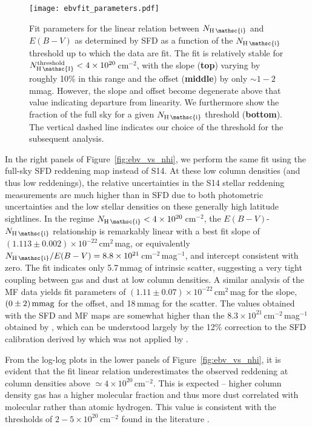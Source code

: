 \documentclass[iop,apj]{emulateapj}
\makeatletter
\def\testbx{bx}%
\DeclareRobustCommand{\ion}[2]{%
\relax\ifmmode
\ifx\testbx\f@series
{\mathbf{#1\,\mathsc{#2}}}\else
{\mathrm{#1\,\mathsc{#2}}}\fi
\else\textup{#1\,{\mdseries\textsc{#2}}}%
\fi}
\makeatother
\begin{document}
\begin{figure}[tp]
	\texttt{[image: ebvfit\_parameters.pdf]}
	\caption{Fit parameters for the linear relation between $N_\ion{H}{i}$ and $E(B-V)$ as determined by SFD as a function of the $N_{\ion{H}{i}}$ threshold up to which the data are fit. The fit is relatively stable for  $N^{\rm threshold}_\ion{H}{I} < 4\times10^{20}$\,cm$^{-2}$, with the slope (\textbf{top}) varying by roughly 10\% in this range and the offset (\textbf{middle}) by only $\sim1-2$\,mmag. However, the slope and offset become degenerate above that value indicating departure from linearity. We furthermore show the fraction of the full sky for a given $N_{\ion{H}{i}}$ threshold (\textbf{bottom}). The vertical dashed line indicates our choice of the threshold for the subsequent analysis.}
	\label{fig:ebv_params}
\end{figure}

In the right panels of Figure~\ref{fig:ebv_vs_nhi}, we perform the same fit using the full-sky SFD reddening map instead of S14. At these low column densities (and thus low reddenings), the relative uncertainties in the S14 stellar reddening measurements are much higher than in SFD due to both photometric uncertainties and the low stellar densities on these generally high latitude sightlines. In the regime $N_\ion{H}{i} < 4\times10^{20}$\,cm$^{-2}$, the $E(B-V)$-$N_\ion{H}{i}$ relationship is remarkably linear with a best fit slope of $\left(1.113\pm0.002\right)\times10^{-22}$\,cm$^2$\,mag, or equivalently $N_\ion{H}{i}/E(B-V) = 8.8\times10^{21}$\,cm$^{-2}$\,mag$^{-1}$, and intercept consistent with zero. The fit indicates only 5.7\,mmag of intrinsic scatter, suggesting a very tight coupling between gas and dust at low column densities. A similar analysis of the MF data yields fit parameters of $\left(1.11\pm0.07\right)\times10^{-22}$\,cm$^2$\,mag for the slope, $(0\pm 2)\rm \, mmag$ for the offset, and 18\,mmag for the scatter. The values obtained with the SFD and MF maps are somewhat higher than the $8.3\times10^{21}$\,cm$^{-2}$\,mag$^{-1}$ obtained by \citet{Liszt_2014a}, which can be understood largely by the 12\% correction to the SFD calibration derived by \citet{Schlafly+Finkbeiner_2011} which was not applied by \citet{Liszt_2014a}.

From the log-log plots in the lower panels of Figure~\ref{fig:ebv_vs_nhi}, it is evident that the fit linear relation underestimates the observed reddening at column densities above $\simeq 4\times10^{20}$\,cm$^{-2}$. This is expected -- higher column density gas has a higher molecular fraction and thus more dust correlated with molecular rather than atomic hydrogen. This value is consistent with the thresholds of $2 - 5\times10^{20}$\,cm$^{-2}$ found in the literature \citep[e.g.][]{Boulanger+etal_1996, Wolfire+etal_2010}.
\end{document}
